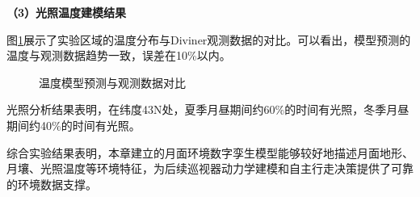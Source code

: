 \textbf{（3）光照温度建模结果}

图\ref{fig:temp_result}展示了实验区域的温度分布与Diviner观测数据的对比。可以看出，模型预测的温度与观测数据趋势一致，误差在10\%以内。

\begin{figure}[htbp]
    \centering
    \caption{温度模型预测与观测数据对比}
    \label{fig:temp_result}
\end{figure}

光照分析结果表明，在纬度43\degree N处，夏季月昼期间约60\%的时间有光照，冬季月昼期间约40\%的时间有光照。

综合实验结果表明，本章建立的月面环境数字孪生模型能够较好地描述月面地形、月壤、光照温度等环境特征，为后续巡视器动力学建模和自主行走决策提供了可靠的环境数据支撑。
